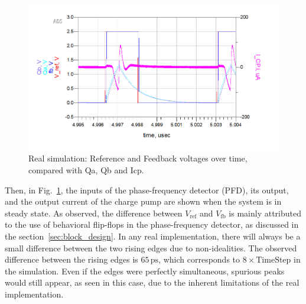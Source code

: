 \documentclass[lettersize,journal]{IEEEtran}
\begin{document}
\begin{figure}[!h]
    \centering
    \includegraphics[width=1\linewidth]{images/ads_results/real_pll/Vref_Vfb_real.png}
    \caption{Real simulation: Reference and Feedback voltages over time, compared with Qa, Qb and Icp.}
    \label{fig:Vref_Vfb_real}
\end{figure}

Then, in Fig.~\ref{fig:Vref_Vfb_real}, the inputs of the phase-frequency detector (PFD), its output, and the output current of the charge pump are shown when the system is in steady state. As observed, the difference between \( V_{\text{ref}} \) and \( V_{\text{fb}} \) is mainly attributed to the use of behavioral flip-flops in the phase-frequency detector, as discussed in the section~\ref{sec:block_design}. In any real implementation, there will always be a small difference between the two rising edges due to non-idealities. The observed difference between the rising edges is \(65 \, \text{ps}\), which corresponds to \(8 \times \text{TimeStep}\) in the simulation. Even if the edges were perfectly simultaneous, spurious peaks would still appear, as seen in this case, due to the inherent limitations of the real implementation.

\newpage
\end{document}
